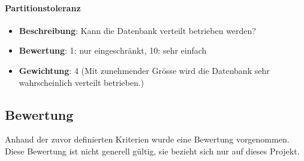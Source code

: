 \paragraph{Partitionstoleranz}
\begin{itemize}
	\item \textbf{Beschreibung}: Kann die Datenbank verteilt betrieben werden?
	\item \textbf{Bewertung}: 1: nur eingeschränkt, 10: sehr einfach
	\item \textbf{Gewichtung}: 4 (Mit zunehmender Grösse wird die Datenbank sehr wahrscheinlich verteilt betrieben.)
\end{itemize}

\newpage
\subsection{Bewertung}\label{architektur_bewertung}
Anhand der zuvor definierten Kriterien wurde eine Bewertung vorgenommen. Diese Bewertung ist nicht generell gültig, sie bezieht sich nur auf dieses Projekt.

